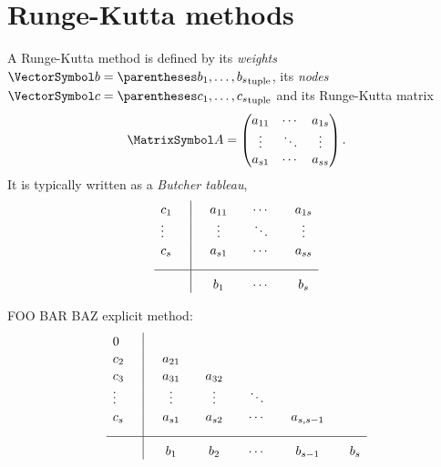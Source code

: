 \documentclass[10pt, a4paper, twoside]{basestyle}
\begin{document}
\section{Runge-Kutta methods}
A Runge-Kutta method is defined by its \emph{weights} $\vb=\tuple{b_1,\dotsc,b_s}$, its \emph{nodes} $\vc=\tuple{c_1,\dotsc,c_s}$ and its Runge-Kutta matrix\[
\matA=
\begin{pmatrix}
a_{11} & \cdots & a_{1s} \\
\vdots & \ddots & \vdots \\
a_{s1} & \cdots & a_{ss}
\end{pmatrix}
\text.
\]
It is typically written as a \emph{Butcher tableau},\[
\begin{array}{l | c c c c c}
\rule{0pt}{2,3ex} c_1    \quad & \quad a_{11} & \quad \cdots & \quad a_{1s} \\
\rule{0pt}{2,3ex} \vdots \quad & \quad \vdots & \quad \ddots & \quad \vdots \\
\rule{0pt}{2,3ex} c_s    \quad & \quad a_{s1} & \quad \cdots & \quad a_{ss} \\
[2,0ex] \hline
\rule{0pt}{3,3ex}              & \quad b_{1}  & \quad \cdots & \quad b_{s}
\end{array}
\]

FOO BAR BAZ explicit method:
\[
\begin{array}{l | c c c c c}
\rule{0pt}{2,3ex} 0      \quad &              &               &              &                 &   \\
\rule{0pt}{2,3ex} c_2    \quad & \quad a_{21} &               &              &                 &   \\
\rule{0pt}{2,3ex} c_3    \quad & \quad a_{31} & \quad a_{32}  &              &                 &   \\
\rule{0pt}{2,3ex} \vdots \quad & \quad \vdots & \quad \vdots  & \quad \ddots &                 &   \\
\rule{0pt}{2,3ex} c_s    \quad & \quad a_{s1} & \quad a_{s2}  & \quad \cdots & \quad a_{s,s-1} & \\[2,0ex] \hline
\rule{0pt}{3,3ex}              & \quad b_{1}  & \quad b_{2}   & \quad \cdots & \quad b_{s-1}   & \quad b_{s}
\end{array}
\]
\end{document}

